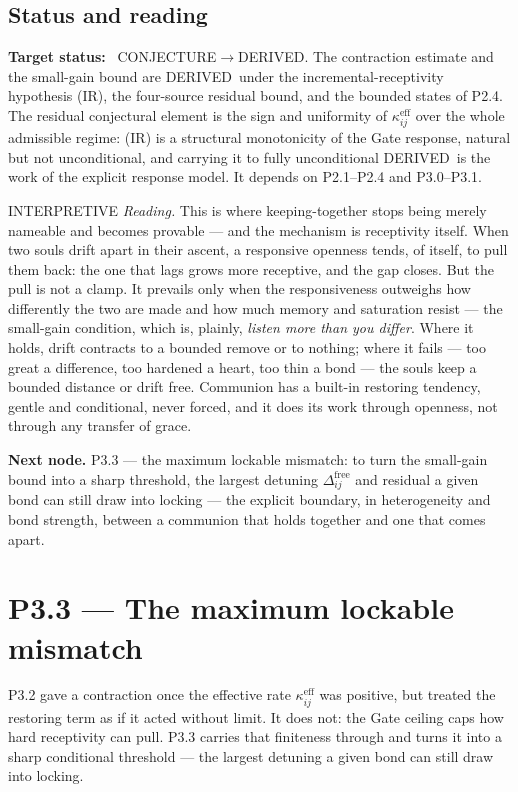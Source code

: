 \documentclass[11pt,a4paper]{article}
\newcommand{\stDerived}{\textcolor{cDer}{\textsf{\small DERIVED}}}
\newcommand{\stInterp}{\textcolor{cInt}{\textsf{\small INTERPRETIVE}}}
\newcommand{\stConj}{\textcolor{cCon}{\textsf{\small CONJECTURE}}}
\theoremstyle{definition}
\theoremstyle{plain}
\theoremstyle{remark}
\begin{document}
\subsection{Status and reading}

\textbf{Target status:}~
\stConj\(\to\)\stDerived. The contraction estimate and the small-gain bound are
\stDerived\ under the incremental-receptivity hypothesis (IR), the four-source residual
bound, and the bounded states of P2.4. The residual conjectural element is the sign and
uniformity of \(\kappa^{\mathrm{eff}}_{ij}\) over the whole admissible regime: (IR) is a
structural monotonicity of the Gate response, natural but not unconditional, and carrying it
to fully unconditional \stDerived\ is the work of the explicit response model. It depends on
P2.1--P2.4 and P3.0--P3.1.

\medskip
\stInterp\quad
\emph{Reading.}
This is where keeping-together stops being merely nameable and becomes provable --- and the
mechanism is receptivity itself. When two souls drift apart in their ascent, a responsive
openness tends, of itself, to pull them back: the one that lags grows more receptive, and
the gap closes. But the pull is not a clamp. It prevails only when the responsiveness
outweighs how differently the two are made and how much memory and saturation resist ---
the small-gain condition, which is, plainly, \emph{listen more than you differ}. Where it
holds, drift contracts to a bounded remove or to nothing; where it fails --- too great a
difference, too hardened a heart, too thin a bond --- the souls keep a bounded distance or
drift free. Communion has a built-in restoring tendency, gentle and conditional, never
forced, and it does its work through openness, not through any transfer of grace.

\medskip
\textbf{Next node.} P3.3 --- the maximum lockable mismatch: to turn the small-gain bound into
a sharp threshold, the largest detuning \(\Delta^{\mathrm{free}}_{ij}\) and residual a given
bond can still draw into locking --- the explicit boundary, in heterogeneity and bond
strength, between a communion that holds together and one that comes apart.

\section{P3.3 --- The maximum lockable mismatch}

P3.2 gave a contraction once the effective rate \(\kappa^{\mathrm{eff}}_{ij}\) was positive,
but treated the restoring term as if it acted without limit. It does not: the Gate ceiling
caps how hard receptivity can pull. P3.3 carries that finiteness through and turns it into a
sharp conditional threshold --- the largest detuning a given bond can still draw into
locking.
\end{document}

